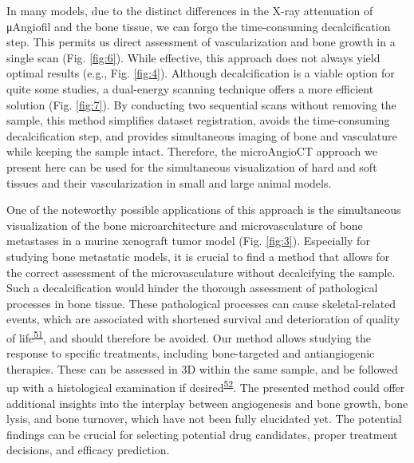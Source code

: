 In many models, due to the distinct differences in the X-ray attenuation of μAngiofil and the bone tissue, we can forgo the time-consuming decalcification step.
This permits us direct assessment of vascularization and bone growth in a single scan (Fig. \ref{fig:6}).
While effective, this approach does not always yield optimal results (e.g., Fig. \ref{fig:4}).
Although decalcification is a viable option for quite some studies, a dual-energy scanning technique offers a more efficient solution (Fig. \ref{fig:7}).
By conducting two sequential scans without removing the sample, this method simplifies dataset registration, avoids the time-consuming decalcification step, and provides simultaneous imaging of bone and vasculature while keeping the sample intact.
Therefore, the microAngioCT approach we present here can be used for the simultaneous visualization of hard and soft tissues and their vascularization in small and large animal models.

One of the noteworthy possible applications of this approach is the simultaneous visualization of the bone microarchitecture and microvasculature of bone metastases in a murine xenograft tumor model (Fig. \ref{fig:3}).
Especially for studying bone metastatic models, it is crucial to find a method that allows for the correct assessment of the microvasculature without decalcifying the sample.
Such a decalcification would hinder the thorough assessment of pathological processes in bone tissue.
These pathological processes can cause skeletal-related events, which are associated with shortened survival and deterioration of quality of life\textsuperscript{\protect\hyperlink{ref-D7D7Wyla}{51}}, and should therefore be avoided.
Our method allows studying the response to specific treatments, including bone-targeted and antiangiogenic therapies.
These can be assessed in 3D within the same sample, and be followed up with a histological examination if desired\textsuperscript{\protect\hyperlink{ref-15Cb0RCtH}{52}}.
The presented method could offer additional insights into the interplay between angiogenesis and bone growth, bone lysis, and bone turnover, which have not been fully elucidated yet.
The potential findings can be crucial for selecting potential drug candidates, proper treatment decisions, and efficacy prediction.

